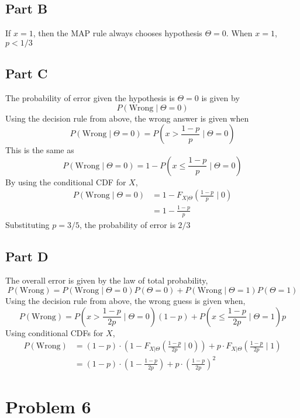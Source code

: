 \documentclass{article}
\begin{document}
\subsection*{Part B}

If $x = 1$, then the MAP rule always chooses hypothesis $\Theta = 0$. When $x
= 1$, $p < 1/3$

\subsection*{Part C}

The probability of error given the hypothesis is $\Theta = 0$ is given by 
$$ P(\mathrm{Wrong} \mid \Theta = 0) $$
Using the decision rule from above, the wrong answer is given when
$$ P(\mathrm{Wrong} \mid \Theta = 0) = P\left(x > \frac{1 - p}{p} \mid \Theta
= 0\right) $$
This is the same as
$$ P(\mathrm{Wrong} \mid \Theta = 0) = 1 - P\left(x \leq \frac{1 - p}{p} \mid
\Theta = 0\right) $$
By using the conditional CDF for $X$,
\begin{align*}
  P(\mathrm{Wrong} \mid \Theta = 0) &= 1 - F_{X|\Theta}\left(\frac{1 - p}{p}
  \mid 0 \right) \\
  &= 1 - \frac{1 - p}{p}
\end{align*}
Substituting $p = 3/5$, the probability of error is $2/3$

\subsection*{Part D}

The overall error is given by the law of total probability,
$$ P(\mathrm{Wrong}) = P(\mathrm{Wrong} \mid \Theta = 0) P(\Theta = 0) +
P(\mathrm{Wrong} \mid \Theta = 1) P(\Theta = 1) $$
Using the decision rule from above, the wrong guess is given when,
$$ P(\mathrm{Wrong}) = P\left(x > \frac{1 - p}{2p} \mid \Theta = 0\right)(1 -
p) + P\left(x \leq \frac{1 - p}{2p} \mid \Theta = 1\right) p $$
Using conditional CDFs for $X$,
\begin{align*}
  P(\mathrm{Wrong}) &= (1 - p) \cdot \left(1 - F_{X|\Theta}\left(\frac{1 -
  p}{2p} \mid 0\right)\right) + p \cdot F_{X|\Theta}\left(\frac{1 - p}{2p}
  \mid 1\right) \\
  &= (1 - p) \cdot \left(1 - \frac{1 - p}{2p}\right) + p \cdot \left(\frac{1
  - p}{2p}\right)^2
\end{align*}

\section*{Problem 6}
\end{document}
